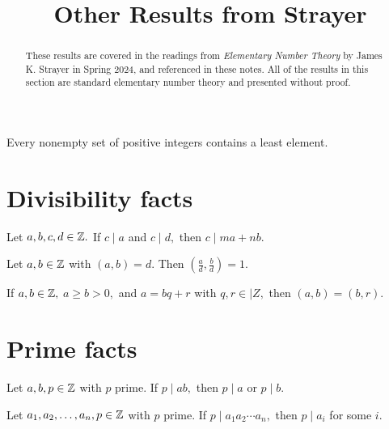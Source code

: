 \documentclass[letterpaper, 11 pt]{ximera}
\title{Other Results from Strayer}
\begin{document}
\begin{abstract}
    These results are covered in the readings from \emph{Elementary Number Theory} by James K. Strayer in Spring 2024, and referenced in these notes. All of the results in this section are standard elementary number theory and presented without proof. 
\end{abstract}

\maketitle

\begin{axiom}\label{well-order}
    Every nonempty set of positive integers contains a least element.
\end{axiom}
    \section*{Divisibility facts}\label{sec:additional-div}

    \begin{lem*}[Proposition 1.2]\label{lem:linear-combo}
         Let $a,b,c,d\in\mathbb Z.$ If $c\mid a$ and $c\mid d,$ then $c\mid ma+nb.$
    \end{lem*}


    \begin{prop*}[Proposition 1.10]\label{prop:div-gcd-rel-prime}
        Let $a,b\in\mathbb Z$ with $(a,b)=d.$ Then $(\tfrac{a}{d},\tfrac{b}{d})=1.$
    \end{prop*}


    \begin{lem*}[Lemma 1.12]\label{lem:gcd-remainders}
     If $a,b\in\mathbb Z,$ $a\geq b\gt 0,$ and $a=bq+r$ with $q,r\in|Z,$ then $(a,b)=(b,r).$
    \end{lem*}
    

\section*{Prime facts}\label{sec:additional-primes}

\begin{lem*}[Lemma 1.14]\label{lem:irreducible-prime}
    Let $a,b,p\in\mathbb Z$ with $p$ prime. If $p\mid ab,$ then $p\mid a$ or $p\mid b.$
\end{lem*}

\begin{cor*}[Corollary 1.15]\label{cor:irreducible-prime} Let $a_1,a_2,\dots,a_n,p\in\mathbb Z$ with $p$ prime. If $p\mid a_1a_2\cdots a_n,$ then $p\mid a_i$ for some $i.$
\end{cor*}
\end{document}
